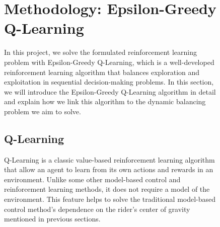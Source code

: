 \documentclass[10pt,a4paper]{article}
\begin{document}
\begin{figure}[H]
	
	
	
	\section{Methodology: Epsilon-Greedy Q-Learning}
	In this project, we solve the formulated reinforcement learning problem with Epsilon-Greedy Q-Learning, which is a well-developed reinforcement learning algorithm that balances exploration and exploitation in sequential decision-making problems. In this section, we will introduce the Epsilon-Greedy Q-Learning algorithm in detail and explain how we link this algorithm to the dynamic balancing problem we aim to solve. 
	
	\subsection{Q-Learning}
	Q-Learning is a classic value-based reinforcement learning algorithm that allow an agent to learn from its own actions and rewards in an environment. Unlike some other model-based control and reinforcement learning methods, it does not require a model of the environment. This feature helps to solve the traditional model-based control method's dependence on the rider's center of gravity mentioned in previous sections. 
	

\end{figure}
\end{document}
